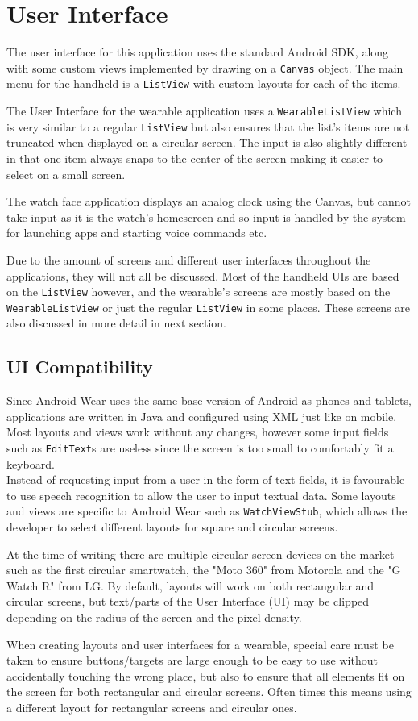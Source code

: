 \section{User Interface}

The user interface for this application uses the standard Android SDK, along
with some custom views implemented by drawing on a \texttt{Canvas} object.
The main menu for the handheld is a \texttt{ListView} with custom layouts
for each of the items.

The User Interface for the wearable application uses a \texttt{WearableListView}
which is very similar to a regular \texttt{ListView} but also ensures that the
list's items are not truncated when displayed on a circular screen. The input
is also slightly different in that one item always snaps to the center of the
screen making it easier to select on a small screen.

The watch face application displays an analog clock using the Canvas, but cannot
take input as it is the watch's homescreen and so input is handled by the system
for launching apps and starting voice commands etc.

Due to the amount of screens and different user interfaces throughout the
applications, they will not all be discussed. Most of the handheld UIs are based
on the \texttt{ListView} however, and the wearable's screens are mostly based
on the \texttt{WearableListView} or just the regular \texttt{ListView} in some
places. These screens are also discussed in more detail in next section.

\subsection{UI Compatibility}
Since Android Wear uses the same base version of Android as phones and tablets,
applications are written in Java and configured using XML just like on mobile.
Most layouts and views work without any changes, however some input fields such
as \texttt{EditText}s are useless since the screen is too small to comfortably
fit a keyboard.\\
Instead of requesting input from a user in the form of text fields, it is
favourable to use speech recognition to allow the user to input textual data.
Some layouts and views are specific to Android Wear such as
\texttt{WatchViewStub}, which allows the developer to select different layouts
for square and circular screens.

At the time of writing there are multiple circular screen devices on the market
such as the first circular smartwatch, the "Moto 360" from Motorola and the "G
Watch R" from LG. By default, layouts will work on both rectangular and
circular screens, but text/parts of the User Interface (UI) may be clipped
depending on the radius of the screen and the pixel density.

When creating layouts and user interfaces for a wearable, special care must be
taken to ensure buttons/targets are large enough to be easy to use without
accidentally touching the wrong place, but also to ensure that all elements fit
on the screen for both rectangular and circular screens. Often times this means
using a different layout for rectangular screens and circular ones.
